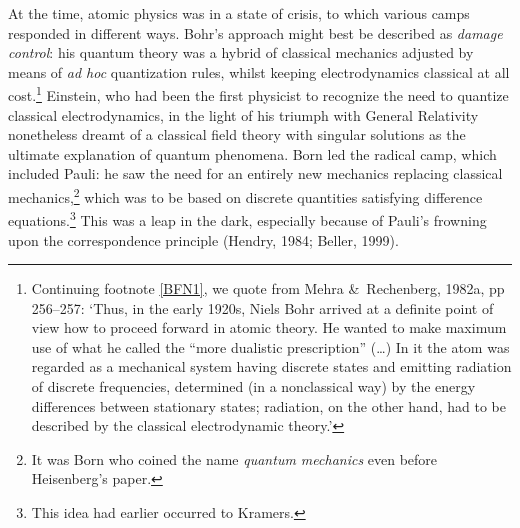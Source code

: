 \documentclass[12pt,titlepage]{article}
\begin{document}
At the time, atomic physics was in a state of crisis, to which various camps 
responded in  different ways. Bohr's approach might best be described as \textit{damage control}: his quantum theory was a hybrid of classical mechanics adjusted by means of \textit{ad hoc} quantization rules, whilst keeping  electrodynamics classical at all cost.\footnote{\label{Bohropp} 
Continuing footnote \ref{BFN1}, we quote from 
 Mehra \&\ Rechenberg, 1982a, pp 256--257: `Thus, in the early 1920s, Niels Bohr arrived at a definite point of view how to proceed forward in atomic theory. He wanted to make maximum use of what he called the ``more dualistic prescription'' (\ldots) In it the atom was regarded as a mechanical system having discrete states and emitting radiation of discrete frequencies, determined (in a nonclassical way) by the energy differences between stationary states; radiation, on the other hand, had to be described by the classical electrodynamic theory.'}    Einstein, who had been  the first physicist to recognize the need to quantize classical electrodynamics, in the light of his triumph with General Relativity  nonetheless dreamt of a classical field theory with singular solutions as the ultimate explanation of quantum phenomena. Born led the radical camp, which included Pauli: he saw the need for an entirely new mechanics replacing classical mechanics,\footnote{It was Born who coined the name \textit{quantum mechanics} even before Heisenberg's paper.} which was to be based on discrete quantities satisfying difference equations.\footnote{This idea had earlier occurred to Kramers.}  This was a leap in the dark, especially because of Pauli's frowning upon the correspondence principle (Hendry, 1984; Beller, 1999). 
\end{document}
